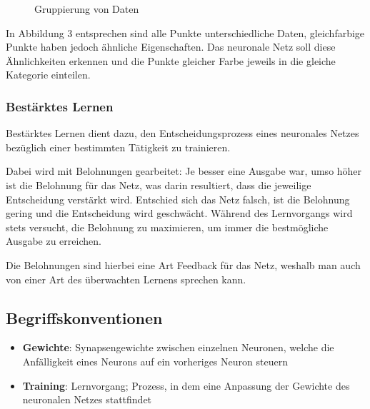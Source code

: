 \documentclass[12pt,a4]{article}
\begin{document}
\begin{figure}[!h]
\centering
{}
\caption{Gruppierung von Daten}
\end{figure}

In Abbildung 3 entsprechen sind alle Punkte unterschiedliche Daten, gleichfarbige Punkte haben jedoch ähnliche Eigenschaften. Das neuronale Netz soll diese Ähnlichkeiten erkennen und die Punkte gleicher Farbe jeweils in die gleiche Kategorie einteilen.

\subsubsection{Bestärktes Lernen}
Bestärktes Lernen dient dazu, den Entscheidungsprozess eines neuronales Netzes bezüglich einer bestimmten Tätigkeit zu trainieren.

Dabei wird mit Belohnungen gearbeitet: Je besser eine Ausgabe war, umso höher ist die Belohnung für das Netz, was darin resultiert, dass die jeweilige Entscheidung verstärkt wird. Entschied sich das Netz falsch, ist die Belohnung gering und die Entscheidung wird geschwächt. Während des Lernvorgangs wird stets versucht, die Belohnung zu maximieren, um immer die bestmögliche Ausgabe zu erreichen.

Die Belohnungen sind hierbei eine Art Feedback für das Netz, weshalb man auch von einer Art des überwachten Lernens sprechen kann.

\subsection{Begriffskonventionen}
\begin{itemize}
\item \textbf{Gewichte}: Synapsengewichte zwischen einzelnen Neuronen, welche die Anfälligkeit eines Neurons auf ein vorheriges Neuron steuern
\item \textbf{Training}: Lernvorgang; Prozess, in dem eine Anpassung der Gewichte des neuronalen Netzes stattfindet
\end{itemize}
\end{document}

